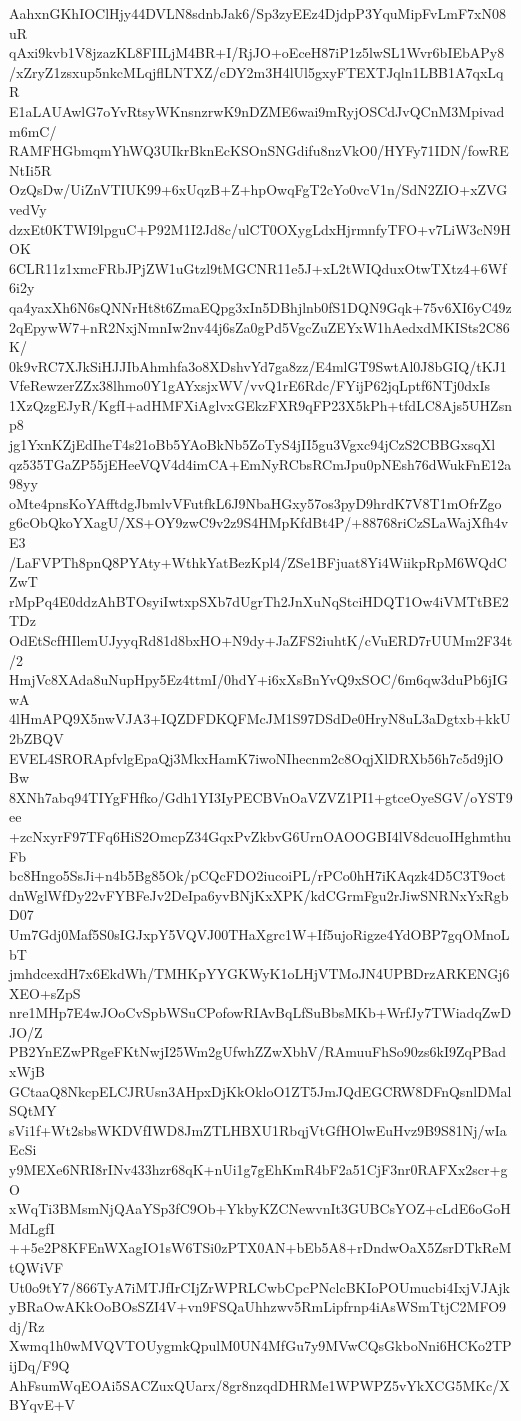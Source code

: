 AahxnGKhIOClHjy44DVLN8sdnbJak6/Sp3zyEEz4DjdpP3YquMipFvLmF7xN08uR
qAxi9kvb1V8jzazKL8FIILjM4BR+I/RjJO+oEceH87iP1z5lwSL1Wvr6bIEbAPy8
/xZryZ1zsxup5nkcMLqjflLNTXZ/cDY2m3H4lUl5gxyFTEXTJqln1LBB1A7qxLqR
E1aLAUAwlG7oYvRtsyWKnsnzrwK9nDZME6wai9mRyjOSCdJvQCnM3Mpivadm6mC/
RAMFHGbmqmYhWQ3UIkrBknEcKSOnSNGdifu8nzVkO0/HYFy71IDN/fowRENtIi5R
OzQsDw/UiZnVTIUK99+6xUqzB+Z+hpOwqFgT2cYo0vcV1n/SdN2ZIO+xZVGvedVy
dzxEt0KTWI9lpguC+P92M1I2Jd8c/ulCT0OXygLdxHjrmnfyTFO+v7LiW3cN9HOK
6CLR11z1xmcFRbJPjZW1uGtzl9tMGCNR11e5J+xL2tWIQduxOtwTXtz4+6Wf6i2y
qa4yaxXh6N6sQNNrHt8t6ZmaEQpg3xIn5DBhjlnb0fS1DQN9Gqk+75v6XI6yC49z
2qEpywW7+nR2NxjNmnIw2nv44j6sZa0gPd5VgcZuZEYxW1hAedxdMKISts2C86K/
0k9vRC7XJkSiHJJIbAhmhfa3o8XDshvYd7ga8zz/E4mlGT9SwtAl0J8bGIQ/tKJ1
VfeRewzerZZx38lhmo0Y1gAYxsjxWV/vvQ1rE6Rdc/FYijP62jqLptf6NTj0dxIs
1XzQzgEJyR/KgfI+adHMFXiAglvxGEkzFXR9qFP23X5kPh+tfdLC8Ajs5UHZsnp8
jg1YxnKZjEdIheT4s21oBb5YAoBkNb5ZoTyS4jII5gu3Vgxc94jCzS2CBBGxsqXl
qz535TGaZP55jEHeeVQV4d4imCA+EmNyRCbsRCmJpu0pNEsh76dWukFnE12a98yy
oMte4pnsKoYAfftdgJbmlvVFutfkL6J9NbaHGxy57os3pyD9hrdK7V8T1mOfrZgo
g6cObQkoYXagU/XS+OY9zwC9v2z9S4HMpKfdBt4P/+88768riCzSLaWajXfh4vE3
/LaFVPTh8pnQ8PYAty+WthkYatBezKpl4/ZSe1BFjuat8Yi4WiikpRpM6WQdCZwT
rMpPq4E0ddzAhBTOsyiIwtxpSXb7dUgrTh2JnXuNqStciHDQT1Ow4iVMTtBE2TDz
OdEtScfHIlemUJyyqRd81d8bxHO+N9dy+JaZFS2iuhtK/cVuERD7rUUMm2F34t/2
HmjVc8XAda8uNupHpy5Ez4ttmI/0hdY+i6xXsBnYvQ9xSOC/6m6qw3duPb6jIGwA
4lHmAPQ9X5nwVJA3+IQZDFDKQFMcJM1S97DSdDe0HryN8uL3aDgtxb+kkU2bZBQV
EVEL4SRORApfvlgEpaQj3MkxHamK7iwoNIhecnm2c8OqjXlDRXb56h7c5d9jlOBw
8XNh7abq94TIYgFHfko/Gdh1YI3IyPECBVnOaVZVZ1PI1+gtceOyeSGV/oYST9ee
+zcNxyrF97TFq6HiS2OmcpZ34GqxPvZkbvG6UrnOAOOGBI4lV8dcuoIHghmthuFb
bc8Hngo5SsJi+n4b5Bg85Ok/pCQcFDO2iucoiPL/rPCo0hH7iKAqzk4D5C3T9oct
dnWglWfDy22vFYBFeJv2DeIpa6yvBNjKxXPK/kdCGrmFgu2rJiwSNRNxYxRgbD07
Um7Gdj0Maf5S0sIGJxpY5VQVJ00THaXgrc1W+If5ujoRigze4YdOBP7gqOMnoLbT
jmhdcexdH7x6EkdWh/TMHKpYYGKWyK1oLHjVTMoJN4UPBDrzARKENGj6XEO+sZpS
nre1MHp7E4wJOoCvSpbWSuCPofowRIAvBqLfSuBbsMKb+WrfJy7TWiadqZwDJO/Z
PB2YnEZwPRgeFKtNwjI25Wm2gUfwhZZwXbhV/RAmuuFhSo90zs6kI9ZqPBadxWjB
GCtaaQ8NkcpELCJRUsn3AHpxDjKkOkloO1ZT5JmJQdEGCRW8DFnQsnlDMalSQtMY
sVi1f+Wt2sbsWKDVfIWD8JmZTLHBXU1RbqjVtGfHOlwEuHvz9B9S81Nj/wIaEcSi
y9MEXe6NRI8rINv433hzr68qK+nUi1g7gEhKmR4bF2a51CjF3nr0RAFXx2scr+gO
xWqTi3BMsmNjQAaYSp3fC9Ob+YkbyKZCNewvnIt3GUBCsYOZ+cLdE6oGoHMdLgfI
++5e2P8KFEnWXagIO1sW6TSi0zPTX0AN+bEb5A8+rDndwOaX5ZsrDTkReMtQWiVF
Ut0o9tY7/866TyA7iMTJfIrCIjZrWPRLCwbCpcPNclcBKIoPOUmucbi4IxjVJAjk
yBRaOwAKkOoBOsSZI4V+vn9FSQaUhhzwv5RmLipfrnp4iAsWSmTtjC2MFO9dj/Rz
Xwmq1h0wMVQVTOUygmkQpulM0UN4MfGu7y9MVwCQsGkboNni6HCKo2TPijDq/F9Q
AhFsumWqEOAi5SACZuxQUarx/8gr8nzqdDHRMe1WPWPZ5vYkXCG5MKc/XBYqvE+V
